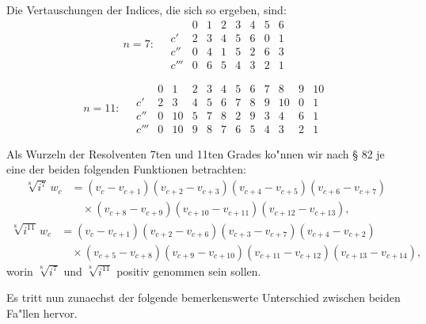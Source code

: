 \documentclass[12pt,a4paper]{article}
\theoremstyle{plain}
\theoremstyle{definition}
\theoremstyle{remark}
\begin{document}
Die Vertauschungen der Indices, die sich so ergeben, sind:
\begin{equation}\label{eq:133_12}
n = 7:\quad
\begin{array}{c|ccccccc}
 & 0 & 1 & 2 & 3 & 4 & 5 & 6 \\ \hline
c'  & 2 & 3 & 4 & 5 & 6 & 0 & 1 \\
c'' & 0 & 4 & 1 & 5 & 2 & 6 & 3 \\
c'''& 0 & 6 & 5 & 4 & 3 & 2 & 1
\end{array}
\end{equation}

\begin{equation}\label{eq:133_13}
n = 11:\quad
\begin{array}{c|ccccccccccc}
 & 0 & 1 & 2 & 3 & 4 & 5 & 6 & 7 & 8 & 9 & 10 \\ \hline
c'   & 2 & 3 & 4 & 5 & 6 & 7 & 8 & 9 & 10 & 0 & 1 \\
c''  & 0 & 10 & 5 & 7 & 8 & 2 & 9 & 3 & 4 & 6 & 1 \\
c''' & 0 & 10 & 9 & 8 & 7 & 6 & 5 & 4 & 3 & 2 & 1
\end{array}
\end{equation}

\newpage

Als Wurzeln der Resolventen 7ten und 11ten Grades ko"nnen wir nach \S{} 82 je eine der beiden folgenden Funktionen betrachten:
\begin{equation}\label{eq:133_14}
\begin{aligned}
\sqrt[8]{i^7}\, w_c &= (v_c - v_{c+1})(v_{c+2} - v_{c+3})(v_{c+4} - v_{c+5})(v_{c+6} - v_{c+7}) \\
                   &\quad \times (v_{c+8} - v_{c+9})(v_{c+10} - v_{c+11})(v_{c+12} - v_{c+13}),
\end{aligned}
\end{equation}
\begin{equation}\label{eq:133_15}
\begin{aligned}
\sqrt[8]{i^{11}}\, w_c &= (v_c - v_{c+1})(v_{c+2} - v_{c+6})(v_{c+3} - v_{c+7})(v_{c+4} - v_{c+2}) \\
                       &\quad \times (v_{c+5} - v_{c+8})(v_{c+9} - v_{c+10})(v_{c+11} - v_{c+12})(v_{c+13} - v_{c+14}),
\end{aligned}
\end{equation}
worin $\sqrt[8]{i^7}$ und $\sqrt[8]{i^{11}}$ positiv genommen sein sollen.

Es tritt nun zunaechst der folgende bemerkenswerte Unterschied zwischen beiden Fa"llen hervor.
\end{document}
